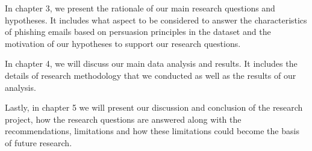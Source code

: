 In chapter 3, we present the rationale of our main research questions
and hypotheses. It includes what aspect to be considered to answer
the characteristics of phishing emails based on persuasion principles
in the dataset and the motivation of our hypotheses to support our
research questions.

In chapter 4, we will discuss our main data analysis and results.
It includes the details of research methodology that we conducted
as well as the results of our analysis.

Lastly, in chapter 5 we will present our discussion and conclusion
of the research project, how the research questions are answered along
with the recommendations, limitations and how these limitations could
become the basis of future research.%


